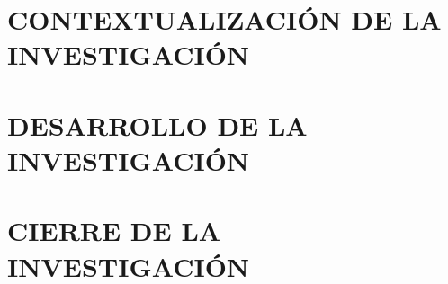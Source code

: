 \documentclass[letter,12pt,openany]{book}
\begin{document}
\frontmatter
\tableofcontents
\listoftables
\listoffigures

\mainmatter

\part{CONTEXTUALIZACIÓN DE LA INVESTIGACIÓN}

\part{DESARROLLO DE LA INVESTIGACIÓN}



%






%
%
%

%

\part{CIERRE DE LA INVESTIGACIÓN}


%

\backmatter


\end{document}
